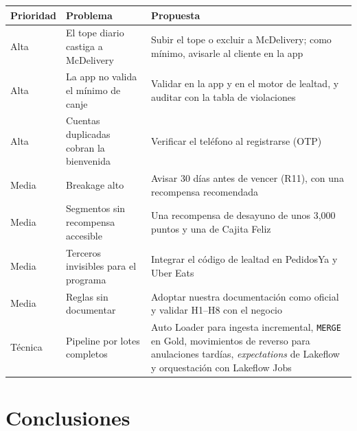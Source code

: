 \documentclass[12pt,a4paper]{article}
\begin{document}
\begin{center}
\renewcommand{\arraystretch}{1.35}
\begin{tabular}{|p{1.4cm}|>{\raggedright\arraybackslash}p{5cm}|>{\raggedright\arraybackslash}p{7.2cm}|}
\hline
\textbf{Prioridad} & \textbf{Problema} & \textbf{Propuesta} \\
\hline
Alta & El tope diario castiga a McDelivery & Subir el tope o excluir a McDelivery; como mínimo,
avisarle al cliente en la app \\
\hline
Alta & La app no valida el mínimo de canje & Validar en la app y en el motor de lealtad, y
auditar con la tabla de violaciones \\
\hline
Alta & Cuentas duplicadas cobran la bienvenida & Verificar el teléfono al registrarse (OTP) \\
\hline
Media & Breakage alto & Avisar 30 días antes de vencer (R11), con una recompensa recomendada \\
\hline
Media & Segmentos sin recompensa accesible & Una recompensa de desayuno de unos 3,000 puntos y una
de Cajita Feliz \\
\hline
Media & Terceros invisibles para el programa & Integrar el código de lealtad en PedidosYa y Uber
Eats \\
\hline
Media & Reglas sin documentar & Adoptar nuestra documentación como oficial y validar H1--H8 con el
negocio \\
\hline
Técnica & Pipeline por lotes completos & Auto Loader para ingesta incremental, \texttt{MERGE} en
Gold, movimientos de reverso para anulaciones tardías, \emph{expectations} de Lakeflow y
orquestación con Lakeflow Jobs \\
\hline
\end{tabular}
\end{center}

\section{Conclusiones}
\end{document}
